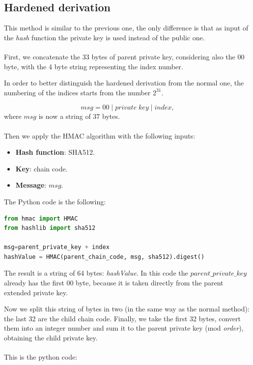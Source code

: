\subsection{Hardened derivation}
This method is similar to the previous one, the only difference is that as input of the \textit{hash} function the private key is used instead of the public one. \\ \\
First, we concatenate the 33 bytes of parent private key, considering also the $00$ byte, with the 4 byte string representing the index number.

\begin{remark}
In order to better distinguish the hardened derivation from the normal one, the numbering of the indices starts from the number $2^{31}.$
\end{remark} 
\begin{equation*}
msg = 00 \;|\; private\;key \;|\; index,
\end{equation*}
where $msg$ is now a string of $37$ bytes. \\ \\
Then we apply the HMAC algorithm with the following inputs:

\begin{itemize}[label=$\odot$]
	\item \textbf{Hash function}: SHA512.
	\item \textbf{Key}: chain code.
	\item \textbf{Message}: $msg$.
\end{itemize}
The Python code is the following:
\begin{lstlisting}[language=Python]
from hmac import HMAC
from hashlib import sha512

msg=parent_private_key + index
hashValue = HMAC(parent_chain_code, msg, sha512).digest()
\end{lstlisting}
\begin{flushleft}
	The result is a string of 64 bytes: \textit{hashValue}. In this code the $parent\_private\_key$ already has the first $00$ byte, because it is taken directly from the parent extended private key.
\end{flushleft}
Now we split this string of bytes in two (in the same way as the normal method): the last 32 are the child chain code. Finally, we take the first 32 bytes, convert them into an integer number and sum it to the parent private key (mod \textit{order}), obtaining the child private key.\\ \\
This is the python code:

